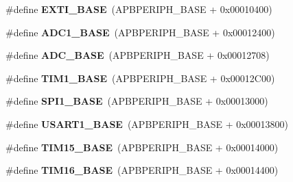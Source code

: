 \begin{DoxyCompactItemize}
\item 
\mbox{\label{group___peripheral__memory__map_ga87371508b3bcdcd98cd1ec629be29061}} 
\#define {\bfseries E\+X\+T\+I\+\_\+\+B\+A\+SE}~(A\+P\+B\+P\+E\+R\+I\+P\+H\+\_\+\+B\+A\+SE + 0x00010400)
\item 
\mbox{\label{group___peripheral__memory__map_ga695c9a2f892363a1c942405c8d351b91}} 
\#define {\bfseries A\+D\+C1\+\_\+\+B\+A\+SE}~(A\+P\+B\+P\+E\+R\+I\+P\+H\+\_\+\+B\+A\+SE + 0x00012400)
\item 
\mbox{\label{group___peripheral__memory__map_gad06cb9e5985bd216a376f26f22303cd6}} 
\#define {\bfseries A\+D\+C\+\_\+\+B\+A\+SE}~(A\+P\+B\+P\+E\+R\+I\+P\+H\+\_\+\+B\+A\+SE + 0x00012708)
\item 
\mbox{\label{group___peripheral__memory__map_gaf8aa324ca5011b8173ab16585ed7324a}} 
\#define {\bfseries T\+I\+M1\+\_\+\+B\+A\+SE}~(A\+P\+B\+P\+E\+R\+I\+P\+H\+\_\+\+B\+A\+SE + 0x00012\+C00)
\item 
\mbox{\label{group___peripheral__memory__map_ga50cd8b47929f18b05efbd0f41253bf8d}} 
\#define {\bfseries S\+P\+I1\+\_\+\+B\+A\+SE}~(A\+P\+B\+P\+E\+R\+I\+P\+H\+\_\+\+B\+A\+SE + 0x00013000)
\item 
\mbox{\label{group___peripheral__memory__map_ga86162ab3f740db9026c1320d46938b4d}} 
\#define {\bfseries U\+S\+A\+R\+T1\+\_\+\+B\+A\+SE}~(A\+P\+B\+P\+E\+R\+I\+P\+H\+\_\+\+B\+A\+SE + 0x00013800)
\item 
\mbox{\label{group___peripheral__memory__map_ga7ab42ce1846930569d742d339b554078}} 
\#define {\bfseries T\+I\+M15\+\_\+\+B\+A\+SE}~(A\+P\+B\+P\+E\+R\+I\+P\+H\+\_\+\+B\+A\+SE + 0x00014000)
\item 
\mbox{\label{group___peripheral__memory__map_ga16c97093a531d763b0794c3e6d09e1bf}} 
\#define {\bfseries T\+I\+M16\+\_\+\+B\+A\+SE}~(A\+P\+B\+P\+E\+R\+I\+P\+H\+\_\+\+B\+A\+SE + 0x00014400)
\item 
\mbox{\label{group___peripheral__memory__map_gaffbedbe30e8c4cffdea326d6c1800574}} 

\end{DoxyCompactItemize}
